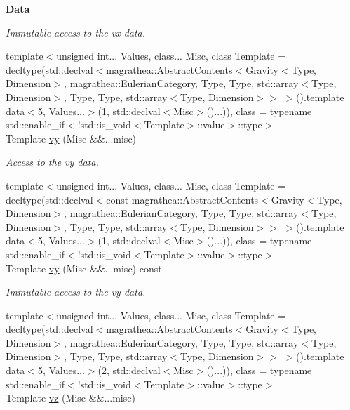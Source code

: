 \begin{Indent}{\bf Data}
\begin{DoxyCompactItemize}
\begin{DoxyCompactList}\small\item\em Immutable access to the vx data. \end{DoxyCompactList}\item 
{\footnotesize template$<$unsigned int... Values, class... Misc, class Template  = decltype(std\-::declval$<$magrathea\-::\-Abstract\-Contents$<$\-Gravity$<$\-Type, Dimension$>$, magrathea\-::\-Eulerian\-Category, Type, Type, std\-::array$<$\-Type, Dimension$>$, Type, Type, std\-::array$<$\-Type, Dimension$>$$>$ $>$().\-template data$<$5, Values...$>$(1, std\-::declval$<$\-Misc$>$()...)), class  = typename std\-::enable\-\_\-if$<$!std\-::is\-\_\-void$<$\-Template$>$\-::value$>$\-::type$>$ }\\Template \hyperlink{exceptionGravity_a29260804923540321b76561d5175867e}{vy} (Misc \&\&...misc)
\begin{DoxyCompactList}\small\item\em Access to the vy data. \end{DoxyCompactList}\item 
{\footnotesize template$<$unsigned int... Values, class... Misc, class Template  = decltype(std\-::declval$<$const magrathea\-::\-Abstract\-Contents$<$\-Gravity$<$\-Type, Dimension$>$, magrathea\-::\-Eulerian\-Category, Type, Type, std\-::array$<$\-Type, Dimension$>$, Type, Type, std\-::array$<$\-Type, Dimension$>$$>$ $>$().\-template data$<$5, Values...$>$(1, std\-::declval$<$\-Misc$>$()...)), class  = typename std\-::enable\-\_\-if$<$!std\-::is\-\_\-void$<$\-Template$>$\-::value$>$\-::type$>$ }\\Template \hyperlink{exceptionGravity_a966c5d37ea1814ae2b6ef95cd8aee3de}{vy} (Misc \&\&...misc) const 
\begin{DoxyCompactList}\small\item\em Immutable access to the vy data. \end{DoxyCompactList}\item 
{\footnotesize template$<$unsigned int... Values, class... Misc, class Template  = decltype(std\-::declval$<$magrathea\-::\-Abstract\-Contents$<$\-Gravity$<$\-Type, Dimension$>$, magrathea\-::\-Eulerian\-Category, Type, Type, std\-::array$<$\-Type, Dimension$>$, Type, Type, std\-::array$<$\-Type, Dimension$>$$>$ $>$().\-template data$<$5, Values...$>$(2, std\-::declval$<$\-Misc$>$()...)), class  = typename std\-::enable\-\_\-if$<$!std\-::is\-\_\-void$<$\-Template$>$\-::value$>$\-::type$>$ }\\Template \hyperlink{exceptionGravity_aef5c1f39e540d14a67202dd53fbe3d8e}{vz} (Misc \&\&...misc)

\end{DoxyCompactItemize}
\end{Indent}
